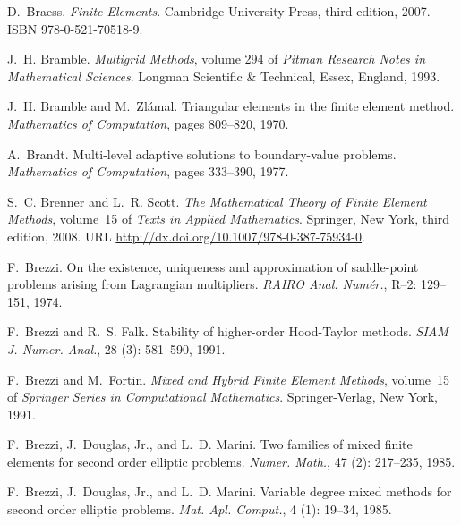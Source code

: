 \begin{thebibliography}{467}
D.~Braess.
\newblock \emph{Finite Elements}.
\newblock Cambridge University Press, third edition, 2007.
\newblock ISBN 978-0-521-70518-9.

J.~H. Bramble.
\newblock \emph{Multigrid Methods}, volume 294 of \emph{Pitman Research Notes
  in Mathematical Sciences}.
\newblock Longman Scientific \& Technical, Essex, England, 1993.

J.~H. Bramble and M.~Zl{\'a}mal.
\newblock Triangular elements in the finite element method.
\newblock \emph{Mathematics of Computation}, pages 809--820, 1970.

A.~Brandt.
\newblock Multi-level adaptive solutions to boundary-value problems.
\newblock \emph{Mathematics of Computation}, pages 333--390, 1977.

S.~C. Brenner and L.~R. Scott.
\newblock \emph{The Mathematical Theory of Finite Element Methods}, volume~15
  of \emph{Texts in Applied Mathematics}.
\newblock Springer, New York, third edition, 2008.
\newblock URL \url{http://dx.doi.org/10.1007/978-0-387-75934-0}.

F.~Brezzi.
\newblock On the existence, uniqueness and approximation of saddle-point
  problems arising from {L}agrangian multipliers.
\newblock \emph{RAIRO Anal. Num\'er.}, R--2: 129--151, 1974.

F.~Brezzi and R.~S. Falk.
\newblock Stability of higher-order {H}ood-{T}aylor methods.
\newblock \emph{SIAM J. Numer. Anal.}, 28 (3): 581--590,
  1991.

F.~Brezzi and M.~Fortin.
\newblock \emph{Mixed and Hybrid Finite Element Methods}, volume~15 of
  \emph{Springer Series in Computational Mathematics}.
\newblock Springer-Verlag, New York, 1991.

F.~Brezzi, J.~Douglas, Jr., and L.~D. Marini.
\newblock Two families of mixed finite elements for second order elliptic
  problems.
\newblock \emph{Numer. Math.}, 47 (2): 217--235,
  1985{}.

F.~Brezzi, J.~Douglas, Jr., and L.~D. Marini.
\newblock Variable degree mixed methods for second order elliptic problems.
\newblock \emph{Mat. Apl. Comput.}, 4 (1): 19--34,
  1985{}.


\end{thebibliography}
